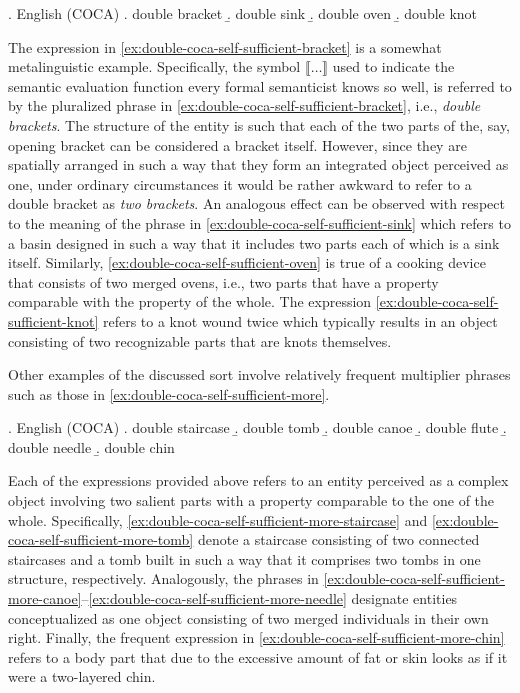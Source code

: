 \ex. English (COCA)\label{ex:double-coca-self-sufficient}
\a. double bracket\label{ex:double-coca-self-sufficient-bracket}
\b. double sink\label{ex:double-coca-self-sufficient-sink}
\b. double oven\label{ex:double-coca-self-sufficient-oven}
\b. double knot\label{ex:double-coca-self-sufficient-knot}

The expression in \ref{ex:double-coca-self-sufficient-bracket} is a somewhat metalinguistic example. Specifically, the symbol $\llbracket\dots\rrbracket$ used to indicate the semantic evaluation function every formal semanticist knows so well, is referred to by the pluralized phrase in \ref{ex:double-coca-self-sufficient-bracket}, i.e., \textit{double brackets}. The structure of the entity is such that each of the two parts of the, say, opening bracket can be considered a bracket itself. However, since they are spatially arranged in such a way that they form an integrated object perceived as one, under ordinary circumstances it would be rather awkward to refer to a double bracket as \textit{two brackets}. An analogous effect can be observed with respect to the meaning of the phrase in \ref{ex:double-coca-self-sufficient-sink} which refers to a basin designed in such a way that it includes two parts each of which is a sink itself. Similarly, \ref{ex:double-coca-self-sufficient-oven} is true of a cooking device that consists of two merged ovens, i.e., two parts that have a property comparable with the property of the whole. The expression \ref{ex:double-coca-self-sufficient-knot} refers to a knot wound twice which typically results in an object consisting of two recognizable parts that are knots themselves. 

Other examples of the discussed sort involve relatively frequent multiplier phrases such as those in \ref{ex:double-coca-self-sufficient-more}. 

\ex. English (COCA)\label{ex:double-coca-self-sufficient-more}
\a. double staircase\label{ex:double-coca-self-sufficient-more-staircase}
\b. double tomb\label{ex:double-coca-self-sufficient-more-tomb}
\b. double canoe\label{ex:double-coca-self-sufficient-more-canoe}
\b. double flute\label{ex:double-coca-self-sufficient-more-flute}
\b. double needle\label{ex:double-coca-self-sufficient-more-needle}
\b. double chin\label{ex:double-coca-self-sufficient-more-chin}

Each of the expressions provided above refers to an entity perceived as a complex object involving two salient parts with a property comparable to the one of the whole. Specifically, \ref{ex:double-coca-self-sufficient-more-staircase} and \ref{ex:double-coca-self-sufficient-more-tomb} denote a staircase consisting of two connected staircases and a tomb built in such a way that it comprises two tombs in one structure, respectively. Analogously, the phrases in \ref{ex:double-coca-self-sufficient-more-canoe}--\ref{ex:double-coca-self-sufficient-more-needle} designate entities conceptualized as one object consisting of two merged individuals in their own right. Finally, the frequent expression in \ref{ex:double-coca-self-sufficient-more-chin} refers to a body part that due to the excessive amount of fat or skin looks as if it were a two-layered chin.

